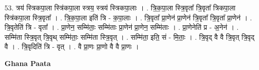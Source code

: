 \documentclass[17pt]{extarticle}
\begin{document}
53. त्रय॑ स्त्रिकपा॒ला स्त्रि॑कपा॒ला स्त्रय॒ स्त्रय॑ स्त्रिकपा॒लाः । . त्रि॒क॒पा॒ला स्त्रि॒वृता᳚ त्रि॒वृता᳚ त्रिकपा॒ला स्त्रि॑कपा॒ला स्त्रि॒वृता᳚ । . त्रि॒क॒पा॒ला इति॑ त्रि - क॒पा॒लाः । . त्रि॒वृता᳚ प्रा॒णेन॑ प्रा॒णेन॑ त्रि॒वृता᳚ त्रि॒वृता᳚ प्रा॒णेन॑ । . त्रि॒वृतेति॑ त्रि - वृता᳚ । . प्रा॒णेन॒ सम्मि॑ताः॒ सम्मि॑ताः प्रा॒णेन॑ प्रा॒णेन॒ सम्मि॑ताः । . प्रा॒णेनेति॑ प्र - अ॒नेन॑ । . सम्मि॑ता स्त्रि॒वृत् त्रि॒वृथ् सम्मि॑ताः॒ सम्मि॑ता स्त्रि॒वृत् । . सम्मि॑ता॒ इति॒ सं - मि॒ताः॒ । . त्रि॒वृद् वै वै त्रि॒वृत् त्रि॒वृद् वै । . त्रि॒वृदिति॑ त्रि - वृत् । . वै प्रा॒णः प्रा॒णो वै वै प्रा॒णः । \newline

\textbf{Ghana Paata } \newline
\end{document}
